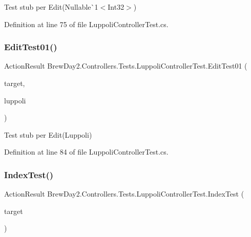 Test stub per Edit(Nullable\`{}1$<$Int32$>$)



Definition at line 75 of file Luppoli\+Controller\+Test.\+cs.

\mbox{\label{class_brew_day2_1_1_controllers_1_1_tests_1_1_luppoli_controller_test_ab291b8ada5729287040431f2881e12c2}} 
\subsubsection{\texorpdfstring{Edit\+Test01()}{EditTest01()}}
{\footnotesize\ttfamily Action\+Result Brew\+Day2.\+Controllers.\+Tests.\+Luppoli\+Controller\+Test.\+Edit\+Test01 (\begin{DoxyParamCaption}\item[{\mbox{[}\+Pex\+Assume\+Under\+Test\mbox{]} \mbox{\hyperlink{class_brew_day2_1_1_controllers_1_1_luppoli_controller}{Luppoli\+Controller}}}]{target,  }\item[{\mbox{\hyperlink{class_brew_day2_1_1_models_1_1_luppoli}{Luppoli}}}]{luppoli }\end{DoxyParamCaption})}



Test stub per Edit(\+Luppoli)



Definition at line 84 of file Luppoli\+Controller\+Test.\+cs.

\mbox{\label{class_brew_day2_1_1_controllers_1_1_tests_1_1_luppoli_controller_test_a3236d7beaf542519ce1e815457659512}} 
\subsubsection{\texorpdfstring{Index\+Test()}{IndexTest()}}
{\footnotesize\ttfamily Action\+Result Brew\+Day2.\+Controllers.\+Tests.\+Luppoli\+Controller\+Test.\+Index\+Test (\begin{DoxyParamCaption}\item[{\mbox{[}\+Pex\+Assume\+Under\+Test\mbox{]} \mbox{\hyperlink{class_brew_day2_1_1_controllers_1_1_luppoli_controller}{Luppoli\+Controller}}}]{target }\end{DoxyParamCaption})}




